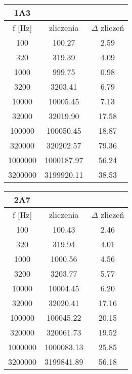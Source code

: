 \begin{table}
\begin{multicols}{3}
\begin{adjustbox}{width=1\linewidth,left}
                \begin{tabular}{|c|c|c|} 
                        \hline 
                        1A3 & & \\ \hline
                        f [Hz] & zliczenia & $\Delta$ zliczeń \\ \hline
                       100 & 100.27 & 2.59\\ \hline 
                       320 & 319.39 & 4.09\\ \hline 
                       1000 & 999.75 & 0.98\\ \hline 
                       3200 & 3203.41 & 6.79\\ \hline 
                       10000 & 10005.45 & 7.13\\ \hline 
                       32000 & 32019.90 & 17.58\\ \hline 
                       100000 & 100050.45 & 18.87\\ \hline 
                       320000 & 320202.57 & 79.36\\ \hline 
                       1000000 & 1000187.97 & 56.24\\ \hline 
                       3200000 & 3199920.11 & 38.53\\ \hline
               \end{tabular}
        \end{adjustbox}

               \begin{adjustbox}{width=1\linewidth,left}

               \begin{tabular}{|c|c|c|}  
                \hline 
                2A7 & & \\ \hline
                f [Hz] & zliczenia & $\Delta$ zliczeń \\ \hline
                100 & 100.43 & 2.46\\ \hline 
                320 & 319.94 & 4.01\\ \hline 
                1000 & 1000.56 & 4.56\\ \hline 
                3200 & 3203.77 & 5.77\\ \hline 
                10000 & 10004.45 & 6.20\\ \hline 
                32000 & 32020.41 & 17.16\\ \hline 
                100000 & 100045.22 & 20.15\\ \hline 
                320000 & 320061.73 & 19.52\\ \hline 
                1000000 & 1000083.13 & 25.85\\ \hline 
                3200000 & 3199841.89 & 56.18\\ \hline
        \end{tabular} \par
\end{adjustbox}

        \end{multicols}

\end{table}




